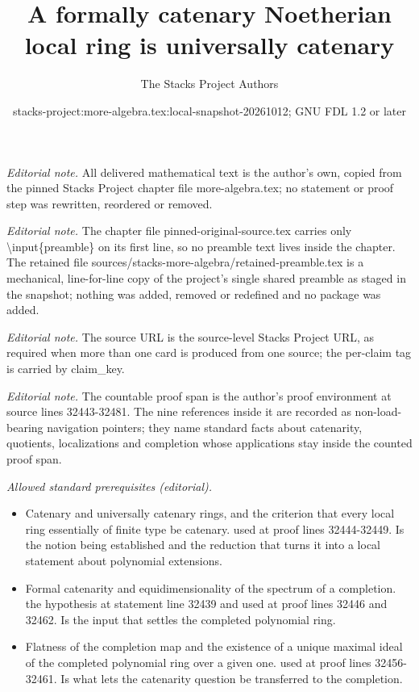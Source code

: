 \documentclass[10pt,a4paper]{amsart}
\title{A formally catenary Noetherian local ring is universally catenary}
\author{The Stacks Project Authors}
\date{stacks-project:more-algebra.tex:local-snapshot-20261012; GNU FDL 1.2 or later}
\theoremstyle{plain}
\theoremstyle{definition}
\theoremstyle{remark}
\numberwithin{equation}{subsection}
\begin{document}
\maketitle
\setcounter{subsection}{1}
\noindent\textit{Editorial note.} All delivered mathematical text is the author's own, copied from the pinned Stacks Project chapter file more-algebra.tex; no statement or proof step was rewritten, reordered or removed.\par\medskip
\noindent\textit{Editorial note.} The chapter file pinned-original-source.tex carries only \textbackslash{}input\{preamble\} on its first line, so no preamble text lives inside the chapter. The retained file sources/stacks-more-algebra/retained-preamble.tex is a mechanical, line-for-line copy of the project's single shared preamble as staged in the snapshot; nothing was added, removed or redefined and no package was added.\par\medskip
\noindent\textit{Editorial note.} The source URL is the source-level Stacks Project URL, as required when more than one card is produced from one source; the per-claim tag is carried by claim\_key.\par\medskip
\noindent\textit{Editorial note.} The countable proof span is the author's proof environment at source lines 32443-32481. The nine references inside it are recorded as non-load-bearing navigation pointers; they name standard facts about catenarity, quotients, localizations and completion whose applications stay inside the counted proof span.\par\medskip
\noindent\textit{Allowed standard prerequisites (editorial).}\begin{itemize}
\item Catenary and universally catenary rings, and the criterion that every local ring essentially of finite type be catenary. used at proof lines 32444-32449. Is the notion being established and the reduction that turns it into a local statement about polynomial extensions.
\item Formal catenarity and equidimensionality of the spectrum of a completion. the hypothesis at statement line 32439 and used at proof lines 32446 and 32462. Is the input that settles the completed polynomial ring.
\item Flatness of the completion map and the existence of a unique maximal ideal of the completed polynomial ring over a given one. used at proof lines 32456-32461. Is what lets the catenarity question be transferred to the completion.
\end{itemize}\medskip
\end{document}
